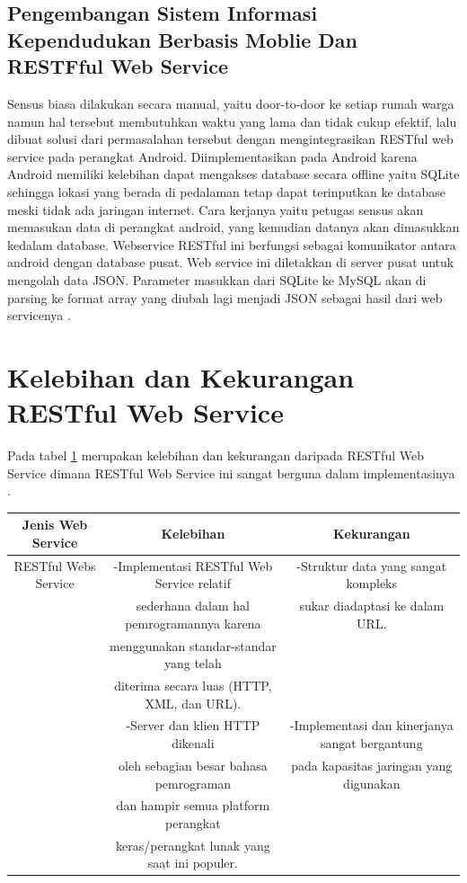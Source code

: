 \subsection{Pengembangan Sistem Informasi Kependudukan Berbasis Moblie Dan RESTFful Web Service}
Sensus biasa dilakukan secara manual, yaitu door-to-door ke setiap rumah warga namun hal tersebut membutuhkan waktu yang lama dan tidak cukup efektif, lalu dibuat solusi dari permasalahan tersebut dengan mengintegrasikan RESTful web service pada perangkat Android. Diimplementasikan pada Android karena Android memiliki kelebihan dapat mengakses database secara offline yaitu SQLite sehingga lokasi yang berada di pedalaman tetap dapat terinputkan ke database meski tidak ada jaringan internet.
Cara kerjanya yaitu petugas sensus akan memasukan data di perangkat android, yang kemudian datanya akan dimasukkan kedalam database. Webservice RESTful ini berfungsi sebagai komunikator antara android dengan database pusat. Web service ini diletakkan di server pusat untuk mengolah data JSON. Parameter masukkan dari SQLite ke MySQL akan di parsing ke format array yang diubah lagi menjadi JSON sebagai hasil dari web servicenya \cite{kurniawati2016pengembangan}.

\section{Kelebihan dan Kekurangan RESTful Web Service}
Pada tabel \ref{table:contoh} merupakan kelebihan dan kekurangan daripada RESTful Web Service dimana RESTful Web Service ini sangat berguna dalam implementasinya \cite{nugroho2012perbandingan}.
\begin{table}[h]
\begin{tabular}{|c|c|c|}
\hline
Jenis Web Service&Kelebihan&Kekurangan\\
\hline
RESTful Webs Service&-Implementasi RESTful Web Service relatif& -Struktur data yang sangat kompleks\\
&sederhana dalam hal pemrogramannya karena& sukar diadaptasi ke dalam URL.\\
&menggunakan standar-standar yang telah&\\
&diterima secara luas (HTTP, XML, dan URL).&\\
&-Server dan klien HTTP dikenali&-Implementasi dan kinerjanya sangat bergantung\\
&oleh sebagian besar bahasa pemrograman&pada kapasitas jaringan yang digunakan\\
&dan hampir semua platform perangkat&\\
&keras/perangkat lunak yang saat ini populer.&\\
\hline
\end{tabular}
\label{table:contoh}
\end{table}

